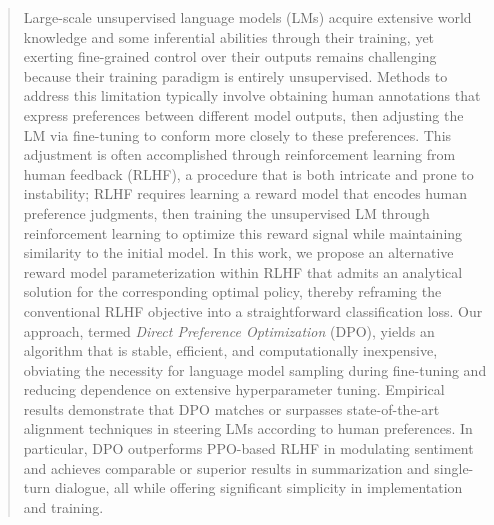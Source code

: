 \begin{abstract}
Large-scale unsupervised language models (LMs) acquire extensive world knowledge and some inferential abilities through their training, yet exerting fine-grained control over their outputs remains challenging because their training paradigm is entirely unsupervised. Methods to address this limitation typically involve obtaining human annotations that express preferences between different model outputs, then adjusting the LM via fine-tuning to conform more closely to these preferences. This adjustment is often accomplished through reinforcement learning from human feedback (RLHF), a procedure that is both intricate and prone to instability; RLHF requires learning a reward model that encodes human preference judgments, then training the unsupervised LM through reinforcement learning to optimize this reward signal while maintaining similarity to the initial model. In this work, we propose an alternative reward model parameterization within RLHF that admits an analytical solution for the corresponding optimal policy, thereby reframing the conventional RLHF objective into a straightforward classification loss. Our approach, termed \textit{Direct Preference Optimization} (DPO), yields an algorithm that is stable, efficient, and computationally inexpensive, obviating the necessity for language model sampling during fine-tuning and reducing dependence on extensive hyperparameter tuning. Empirical results demonstrate that DPO matches or surpasses state-of-the-art alignment techniques in steering LMs according to human preferences. In particular, DPO outperforms PPO-based RLHF in modulating sentiment and achieves comparable or superior results in summarization and single-turn dialogue, all while offering significant simplicity in implementation and training.
\end{abstract}

